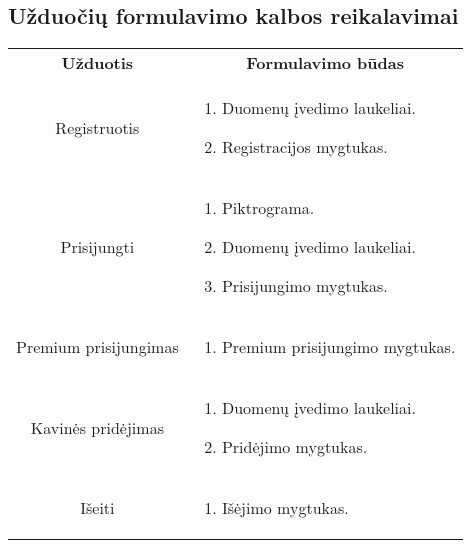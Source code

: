 \documentclass{VUMIFPSkursinis}
\begin{document}
\subsection{Užduočių formulavimo kalbos reikalavimai}
\begin{center}

	\begin{longtable}{|p{2cm}|p{16cm}|}
	\hline
	    \rowcolor{lightgray}
		\multicolumn{2}{|c|}{Užduočių formulavimo kalbos reikalavimai}\\
		
	\hline
		\multicolumn{1}{|c|}{{\bfseries Užduotis}}&
		\multicolumn{1}{|c|}{{\bfseries Formulavimo būdas}}\\		
	\hline 	
		\multicolumn{1}{|c|}{Registruotis}&
		\multicolumn{1}{|p{8,6cm}|}{
			\begin{enumerate}
				\item Duomenų įvedimo laukeliai.
				\item Registracijos mygtukas.
			\end{enumerate}}\\
	
	\hline 	
		\multicolumn{1}{|c|}{Prisijungti}&
		\multicolumn{1}{|p{8,6cm}|}{
			\begin{enumerate}
				\item Piktrograma. 
				\item Duomenų įvedimo laukeliai.
				\item Prisijungimo  mygtukas.
			\end{enumerate}}\\
	
	\hline 	
		\multicolumn{1}{|c|}{Premium prisijungimas}&
		\multicolumn{1}{|p{8,6cm}|}{
			\begin{enumerate}
				\item Premium prisijungimo mygtukas.
			\end{enumerate}}\\
	
	\hline 	
		\multicolumn{1}{|c|}{Kavinės pridėjimas}&
		\multicolumn{1}{|p{8,6cm}|}{
			\begin{enumerate}
				\item Duomenų įvedimo laukeliai.
				\item Pridėjimo mygtukas.
			\end{enumerate}}\\
	
	\hline 	
		\multicolumn{1}{|c|}{Išeiti}&
		\multicolumn{1}{|p{8,6cm}|}{
			\begin{enumerate}
				\item Išėjimo mygtukas.
			\end{enumerate}}\\
	

\end{longtable}
\end{center}
\end{document}
